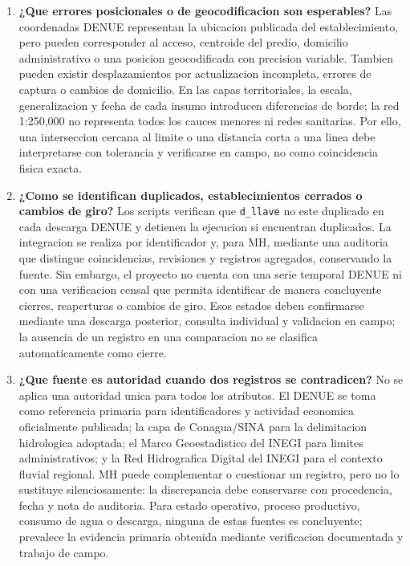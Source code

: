 \documentclass[11pt,letterpaper]{article}
\begin{document}
\begin{enumerate}
    \item \textbf{¿Que errores posicionales o de geocodificacion son esperables?}
    Las coordenadas DENUE representan la ubicacion publicada del establecimiento, pero pueden corresponder al acceso, centroide del predio, domicilio administrativo o una posicion geocodificada con precision variable. Tambien pueden existir desplazamientos por actualizacion incompleta, errores de captura o cambios de domicilio. En las capas territoriales, la escala, generalizacion y fecha de cada insumo introducen diferencias de borde; la red 1:250,000 no representa todos los cauces menores ni redes sanitarias. Por ello, una interseccion cercana al limite o una distancia corta a una linea debe interpretarse con tolerancia y verificarse en campo, no como coincidencia fisica exacta.

    \item \textbf{¿Como se identifican duplicados, establecimientos cerrados o cambios de giro?}
    Los scripts verifican que \texttt{d\_llave} no este duplicado en cada descarga DENUE y detienen la ejecucion si encuentran duplicados. La integracion se realiza por identificador y, para MH, mediante una auditoria que distingue coincidencias, revisiones y registros agregados, conservando la fuente. Sin embargo, el proyecto no cuenta con una serie temporal DENUE ni con una verificacion censal que permita identificar de manera concluyente cierres, reaperturas o cambios de giro. Esos estados deben confirmarse mediante una descarga posterior, consulta individual y validacion en campo; la ausencia de un registro en una comparacion no se clasifica automaticamente como cierre.

    \item \textbf{¿Que fuente es autoridad cuando dos registros se contradicen?}
    No se aplica una autoridad unica para todos los atributos. El DENUE se toma como referencia primaria para identificadores y actividad economica oficialmente publicada; la capa de Conagua/SINA para la delimitacion hidrologica adoptada; el Marco Geoestadistico del INEGI para limites administrativos; y la Red Hidrografica Digital del INEGI para el contexto fluvial regional. MH puede complementar o cuestionar un registro, pero no lo sustituye silenciosamente: la discrepancia debe conservarse con procedencia, fecha y nota de auditoria. Para estado operativo, proceso productivo, consumo de agua o descarga, ninguna de estas fuentes es concluyente; prevalece la evidencia primaria obtenida mediante verificacion documentada y trabajo de campo.
\end{enumerate}
\end{document}
